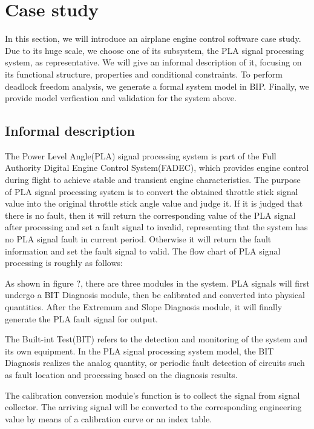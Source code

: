 
\section{Case study}
In this section, we will introduce an airplane engine control software case study. Due to its huge scale, we choose one of its subsystem, the PLA signal processing system, as representative. We will give an informal description of it, focusing on its functional structure, properties and conditional constraints. To perform deadlock freedom analysis, we generate a formal system model in BIP. Finally, we provide model verfication and validation for the system above.

\subsection{Informal description}
The Power Level Angle(PLA) signal processing system is part of the Full Authority Digital Engine Control System(FADEC), which provides engine control during flight to achieve stable and transient engine characteristics. The purpose of PLA signal processing system is to convert the obtained throttle stick signal value into the original throttle stick angle value and judge it. If it is judged that there is no fault, then it will return the corresponding value of the PLA signal after processing and set a fault signal to invalid, representing that the system has no PLA signal fault in current period. Otherwise it will return the fault information and set the fault signal to valid. The flow chart of PLA signal processing is roughly as follows:

As shown in figure ?, there are three modules in the system. PLA signals will first undergo a BIT Diagnosis module, then be calibrated and converted into physical quantities. After the Extremum and Slope Diagnosis module, it will finally generate the PLA fault signal for output.

The Built-int Test(BIT) refers to the detection and monitoring of the system and its own equipment. In the PLA signal processing system model, the BIT Diagnosis realizes the analog quantity, or periodic fault detection of circuits such as fault location and processing based on the diagnosis results.

The calibration conversion module's function is to collect the signal from signal collector. The arriving signal will be converted to the corresponding engineering value by means of a calibration curve or an index table.

